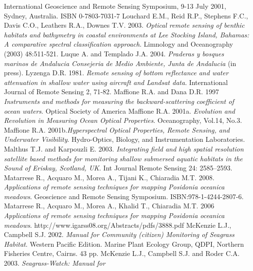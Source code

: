\documentclass[10pt, a4paper]{article}
\begin{document}
\begin{thebibliography}{999}
International Geoscience and Remote Sensing Symposium, 9-13 July 2001, Sydney,
Australia. ISBN 0-7803-7031-7 \pageref{Lewis01}
Louchard E.M., Reid R.P., Stephens F.C., Davis C.O., Leathers R.A., Downes T.V.
2003. \emph{Optical remote sensing of benthic habitats and bathymetry in coastal environments at
Lee Stocking Island, Bahamas: A comparative spectral classification approach}. Limnology
and Oceanography (2003) 48:511-521. \pageref{Louchard03}
Luque A. and Templado J.A. 2004. \emph{Praderas y bosques marinos de Andalucia
Consejeria de Medio Ambiente, Junta de Andalucia} (in press). \pageref{Luque04}
Lyzenga D.R. 1981. \emph{Remote sensing of bottom reflectance and water attenuation in
shallow water using aircraft and Landsat data}. International Journal of Remote Sensing 2,
71-82. \pageref{Lyzenga81}
Maffione R.A. and Dana D.R. 1997 \emph{Instruments and methods for measuring the
backward-scattering coefficient of ocean waters}. Optical Society of America \pageref{Maffione97}
Maffione R.A. 2001a. \emph{Evolution and Revolution in Measuring Ocean Optical Properties}.
Oceanography, Vol.14, No.3. \pageref{Maffione01a}
Maffione R.A. 2001b.\emph{Hyperspectral Optical Properties, Remote Sensing, and
Underwater Visibility}. Hydro-Optics, Biology, and Instrumentation Laboratories. \pageref{Maffione01b}
Malthus T.J. and Karpouzli E. 2003. \emph{Integrating field and high spatial resolution
satellite based methods for monitoring shallow submersed aquatic habitats in the Sound of
Eriskay, Scotland, UK}. Int Journal Remote Sensing 24: 2585–2593. \pageref{Malthus03}
Matarrese R., Acquaro M., Morea A., Tijani K., Chiaradia M.T. 2008. \emph{Applications of
remote sensing techniques for mapping \textit{{Posidonia oceanica}} meadows}. Geoscience and
Remote Sensing Symposium. ISBN:978-1-4244-2807-6. \pageref{Matarrese08}
Matarrese R., Acquaro M., Morea A., Khalid T., Chiaradia M.T. 2006 \emph{Applications of remote
sensing techniques for mapping \textit{{Posidonia oceanica}} meadows}.
http://www.igarss08.org/Abstracts/pdfs/3888.pdf \pageref{Matarrese06}
McKenzie L.J., Campbell S.J. 2002. \emph{Manual for Community (citizen) Monitoring of
Seagrass Habitat}. Western Pacific Edition. Marine Plant Ecology Group, QDPI, Northern
Fisheries Centre, Cairns. 43 pp. \pageref{McKenzie02}
McKenzie L.J., Campbell S.J. and Roder C.A. 2003. \emph{Seagrass-Watch: Manual for
}
\end{thebibliography}
\end{document}
